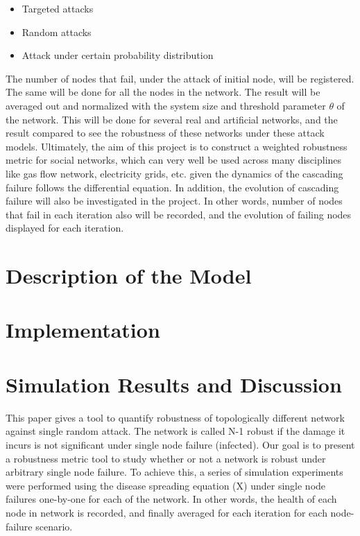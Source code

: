 \documentclass[11pt]{article}
\begin{document}
\begin{itemize}
\item Targeted attacks
\item Random attacks
\item Attack under certain probability distribution
\end{itemize}

 The number of nodes that fail, under the attack of initial node, will be registered. The same will be done for all the nodes in the network. The result will be averaged out and normalized with the system size and threshold parameter $\theta$ of the network. This will be done for several real and artificial networks, and the result compared to see the robustness of these networks under these attack models. Ultimately, the aim of this project is to construct a weighted robustness metric for social networks, which can very well be used across many disciplines like gas flow network, electricity grids, etc. given the dynamics of the cascading failure follows the differential equation. In addition, the evolution of cascading failure will also be investigated in the project. In other words, number of nodes that fail in each iteration also will be recorded, and the evolution of failing nodes displayed for each iteration.

\section{Description of the Model}

\section{Implementation}

\newpage
\section{Simulation Results and Discussion}
This paper gives a tool to quantify robustness of topologically different network against single random attack. The network is called N-1 robust if the damage it incurs is not significant under single node failure (infected). Our goal is to present a robustness metric tool to study whether or not a network is robust under arbitrary single node failure. To achieve this, a series of simulation experiments were performed using the disease spreading equation (X) under single node failures one-by-one for each of the network. In other words, the health of each node in network is recorded, and finally averaged for each iteration for each node-failure scenario. 
\end{document}
